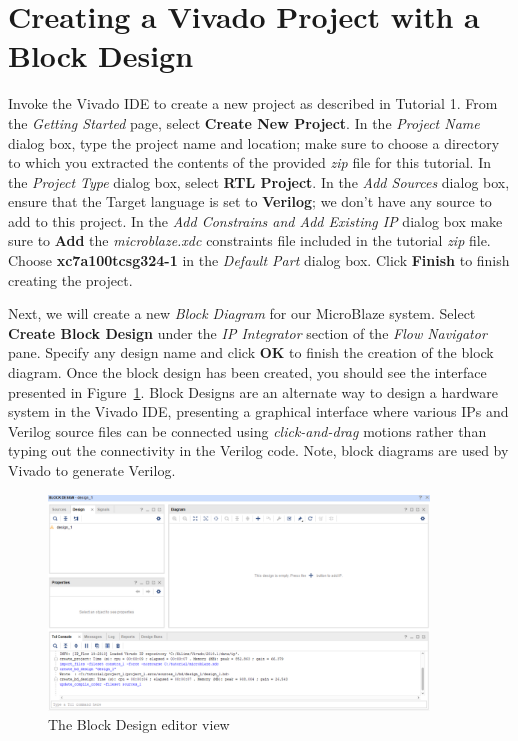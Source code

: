 \documentclass[11pt]{article}
\begin{document}
\section{Creating a Vivado Project with a Block Design}
\label{sec:create_proj}
Invoke the Vivado IDE to create a new project as described in Tutorial 1. From the \textit{Getting Started} page, select \textbf{Create New Project}. In the \textit{Project Name} dialog box, type the project name and location; make sure to choose a directory to which you extracted the contents of the provided \textit{zip} file for this tutorial. In the \textit{Project Type} dialog box, select \textbf{RTL Project}. In the \textit{Add Sources} dialog box, ensure that the Target language is set to \textbf{Verilog}; we don't have any source to add to this project. In the \textit{Add Constrains and Add Existing IP} dialog box make sure to \textbf{Add} the \textit{microblaze.xdc} constraints file included in the tutorial \textit{zip} file. Choose \textbf{xc7a100tcsg324-1} in the \textit{Default Part} dialog box. Click \textbf{Finish} to finish creating the project.

Next, we will create a new \textit{Block Diagram} for our MicroBlaze system. Select \textbf{Create Block Design} under the \textit{IP Integrator} section of the \textit{Flow Navigator} pane. Specify any design name and click \textbf{OK} to finish the creation of the block diagram. Once the block design has been created, you should see the interface presented in Figure~\ref{fig:block_design_blank}. Block Designs are an alternate way to design a hardware system in the Vivado IDE, presenting a graphical interface where various IPs and Verilog source files can be connected using \textit{click-and-drag} motions rather than typing out the connectivity in the Verilog code. Note, block diagrams are used by Vivado to generate Verilog.

\begin{figure}[h]
    \centering
    \includegraphics[width=0.9\textwidth]{images/block_design_blank.png}
    \caption{The Block Design editor view}
    \label{fig:block_design_blank}
\end{figure}
\end{document}
